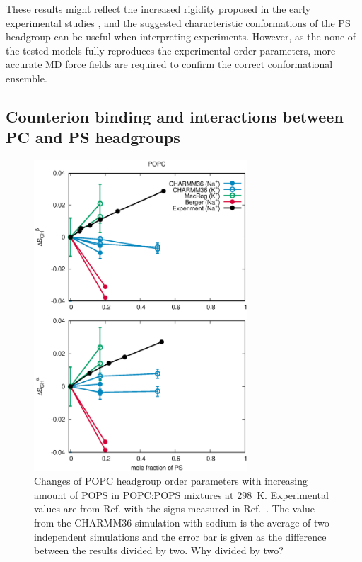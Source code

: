 \documentclass[aps,prl,superscriptaddress,twocolumn]{revtex4}
\begin{document}
These results might reflect the increased rigidity proposed in the early experimental studies \cite{browning80,buldt81}, and the suggested characteristic conformations of the PS headgroup can be useful when interpreting experiments. However, as the none of the tested models fully reproduces the experimental order parameters, more accurate MD force fields are required to confirm the correct conformational ensemble.

\subsection{Counterion binding and interactions between PC and PS headgroups}\label{ciBINDINGsection}



\begin{figure}[!tb]
  \centering
  \includegraphics[width=8.0cm]{../Figs/HGorderparametersPCvsPS.eps}
  \caption{\label{HGorderparametersPCvsPS}
    Changes of POPC headgroup order parameters with increasing amount of POPS in POPC:POPS mixtures at 298~K.
    Experimental values are from Ref.  with the signs measured in Ref.~.
    The value from the CHARMM36 simulation with sodium is the average of two independent simulations and
    the error bar is given as the difference between the results divided by two. {\color{red} Why divided by two?}
  }
\end{figure}
\end{document}
